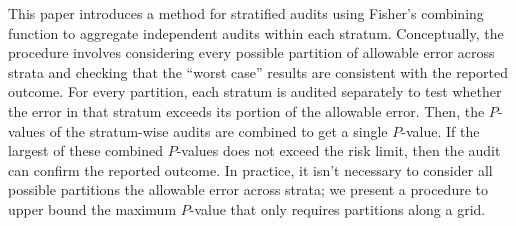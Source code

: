 \documentclass[runningheads]{llncs}
\begin{document}
This paper introduces a method for stratified audits using Fisher's combining function to
aggregate independent audits within each stratum.
Conceptually, the procedure involves considering every possible partition of allowable error across strata and checking 
that the ``worst case'' results are consistent with the reported outcome.
For every partition, each stratum is audited separately to test whether the error in that stratum exceeds its portion of the allowable error.
Then, the $P$-values of the stratum-wise audits are combined to get a single $P$-value.
If the largest of these combined $P$-values does not exceed the risk limit, then the audit can confirm the reported outcome.
In practice, it isn't necessary to consider all possible partitions the allowable error across strata;
we present a procedure to upper bound the maximum $P$-value that only requires partitions along a grid.

%
\end{document}
